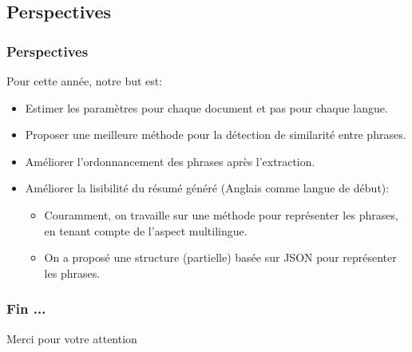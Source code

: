 \documentclass{beamer}
\begin{document}
\subsection{Perspectives}
\begin{frame}
\frametitle{Perspectives}
Pour cette année, notre but est:
\begin{itemize}
\item Estimer les paramètres pour chaque document et pas pour chaque langue.
\item Proposer une meilleure méthode pour la détection de similarité entre phrases.
\item Améliorer l’ordonnancement des phrases après l'extraction.
\item Améliorer la lisibilité du résumé généré (Anglais comme langue de début):
\begin{itemize}
\item Couramment, on travaille sur une méthode pour représenter les phrases, en tenant compte de l'aspect multilingue.
\item On a proposé une structure (partielle) basée sur JSON pour représenter les phrases.
\end{itemize}
\end{itemize}
\end{frame}

\begin{frame}
\frametitle{Fin ...}

\begin{center}
{\Huge Merci pour votre attention}
\end{center}
\end{frame}


\end{document}
